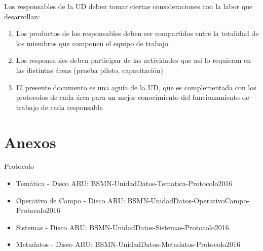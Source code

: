\documentclass{article}
\begin{document}
Los responsables de la UD deben tomar ciertas consideraciones con la labor que desarrollan:

\begin{enumerate}
\item Los productos de los responsables deben ser compartidos entre la totalidad de los miembros que componen el equipo de trabajo.
\item Los responsables deben participar de las actividades que asi lo requieran en las distintas áreas (prueba piloto, capacitación)
\item El presente documento es una aguía de la UD, que es complementada con los protocolos de cada área para un mejor conocimiento del funcionamiento de trabajo de cada responsable
\end{enumerate}

\section{Anexos}
Protocolo
\begin{itemize}
\item Temática - Disco ARU: BSMN-UnidadDatos-Tematica-Protocolo2016
\item Operativo de Campo - Disco ARU: BSMN-UnidadDatos-OperativoCampo-Protocolo2016
\item Sistemas - Disco ARU: BSMN-UnidadDatos-Sistemas-Protocolo2016
\item Metadatos - Disco ARU: BSMN-UnidadDatos-Metadatos-Protocolo2016
\end{itemize}
\end{document}

